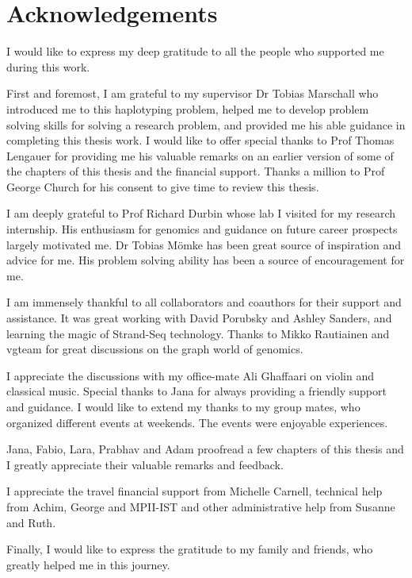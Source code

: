 \chapter*{Acknowledgements}

I would like to express my deep gratitude to all the people who supported me during this work.

First and foremost, I am grateful to my supervisor Dr Tobias Marschall who introduced me to this haplotyping problem, 
helped me to develop problem solving skills for solving a research problem,
and provided me his able guidance in completing this thesis work. 
I would like to offer special thanks to Prof Thomas Lengauer for providing me his valuable remarks on an earlier version of some of the chapters of this thesis and the financial support.
Thanks a million to Prof George Church for his consent to give time to review this thesis.

I am deeply grateful to Prof Richard Durbin whose lab I visited for my research internship.
His enthusiasm for genomics and guidance on future career prospects largely motivated me.
Dr Tobias Mömke has been great source of inspiration and advice for me.
His problem solving ability has been a source of encouragement for me.

I am immensely thankful to all collaborators and coauthors for their support and assistance.
It was great working with David Porubsky and Ashley Sanders, and learning the magic of Strand-Seq technology.
Thanks to Mikko Rautiainen and vgteam for great discussions on the graph world of genomics.

I appreciate the discussions with my office-mate Ali Ghaffaari on violin and classical music.
Special thanks to Jana for always providing a friendly support and guidance.
I would like to extend my thanks to my group mates, who organized different events at weekends. The events were enjoyable experiences.

Jana, Fabio, Lara, Prabhav and Adam proofread a few chapters of this thesis and I greatly appreciate their valuable remarks and feedback.

I appreciate the travel financial support from Michelle Carnell, technical help from Achim, George and MPII-IST and other administrative help from Susanne and Ruth.  

Finally, I would like to express the gratitude to my family and friends, who greatly helped me in this journey.






